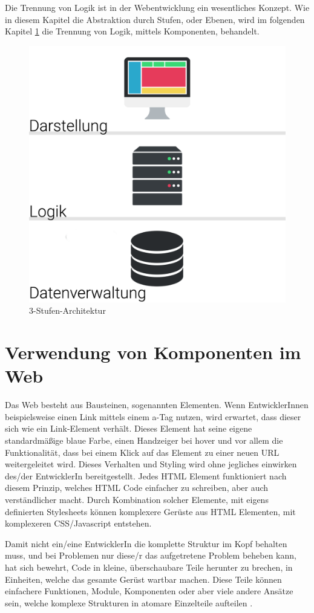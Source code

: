Die Trennung von Logik ist in der Webentwicklung ein wesentliches Konzept. Wie in diesem Kapitel die Abstraktion durch Stufen, oder Ebenen, wird im folgenden Kapitel \ref{cha:component_usage} die Trennung von Logik, mittels Komponenten, behandelt.

\begin{figure}
	\centering
	\includegraphics[width=0.5\linewidth]{images/3-stufen-architektur}
	\caption{3-Stufen-Architektur}
	\label{fig:3-stufen-architektur}
\end{figure}

\section{Verwendung von Komponenten im Web}
\label{cha:component_usage}
Das Web besteht aus Bausteinen, sogenannten Elementen. Wenn EntwicklerInnen beispielsweise einen Link mittels einem a-Tag nutzen, wird erwartet, dass dieser sich wie ein Link-Element verhält. Dieses Element hat seine eigene standardmäßige blaue Farbe, einen Handzeiger bei hover und vor allem die Funktionalität, dass bei einem Klick auf das Element zu einer neuen URL weitergeleitet wird. Dieses Verhalten und Styling wird ohne jegliches einwirken des/der EntwicklerIn bereitgestellt. Jedes HTML Element funktioniert nach diesem Prinzip, welches HTML Code einfacher zu schreiben, aber auch verständlicher macht.
Durch Kombination solcher Elemente, mit eigens definierten Stylesheets können komplexere Gerüste aus HTML Elementen, mit komplexeren CSS/Javascript entstehen.

Damit nicht ein/eine EntwicklerIn die komplette Struktur im Kopf behalten muss, und bei Problemen nur diese/r das aufgetretene Problem beheben kann, hat sich bewehrt, Code in kleine, überschaubare Teile herunter zu brechen, in Einheiten, welche das gesamte Gerüst wartbar machen. Diese Teile können einfachere Funktionen, Module, Komponenten oder aber viele andere Ansätze sein, welche komplexe Strukturen in atomare Einzelteile aufteilen \cite{components-benefit}.

